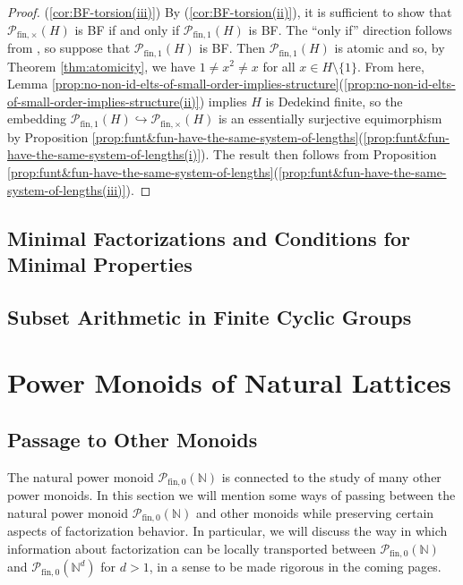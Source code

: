 \documentclass{report}
\newcommand{\NN}{\mathbb{N}}
\renewcommand{\P}{\mathcal{P}}
\newcommand{\fin}{\textrm{fin}}
\newcommand{\funt}{{\textrm{fin}, \times}}
\newcommand{\fun}{{\textrm{fin}, 1}}
\newcommand{\fon}{{\textrm{fin}, 0}}
\renewcommand{\:}{\text{:}}
\newcommand{\PN}{{\P_{\fin,0}(\NN)}}
\theoremstyle{definition}
\begin{document}
\begin{proof}
(\ref{cor:BF-torsion(iii)}) 
By (\ref{cor:BF-torsion(ii)}), it is sufficient to show that $\P_\funt(H)$ is BF if and only if $\P_\fun(H)$ is BF.
The ``only if'' direction follows from \cite[Theorem 2.28(iv) and Corollary 2.29]{fan-tringali18}, so suppose that $\P_\fun(H)$ is BF.
Then $\P_\fun(H)$ is atomic and so, by Theorem \ref{thm:atomicity}, we have $1\neq x^2 \neq x$ for all $x\in H\setminus\{1\}$.
From here, Lemma \ref{prop:no-non-id-elts-of-small-order-implies-structure}(\ref{prop:no-non-id-elts-of-small-order-implies-structure(ii)}) implies $H$ is Dedekind finite, so the embedding $\P_\fun(H)\hookrightarrow\P_\funt(H)$ is an essentially surjective equimorphism by Proposition \ref{prop:funt&fun-have-the-same-system-of-lengths}(\ref{prop:funt&fun-have-the-same-system-of-lengths(i)}).
The result then follows from Proposition \ref{prop:funt&fun-have-the-same-system-of-lengths}(\ref{prop:funt&fun-have-the-same-system-of-lengths(iii)}).
\end{proof}




\section{Minimal Factorizations and Conditions for Minimal Properties} \label{sec:min fac}


\section{Subset Arithmetic in Finite Cyclic Groups} \label{sec:finite cyclic}

\chapter{Power Monoids of Natural Lattices} \label{ch:applications}
\section{Passage to Other Monoids}\label{sec:passage}

The natural power monoid $\PN$ is connected to the study of many other power monoids.
In this section we will mention some ways of passing between the natural power monoid $\PN$ and other monoids while preserving certain aspects of factorization behavior.  
In particular, we will discuss the way in which information about factorization can be locally transported between $\PN$ and $\P_\fon(\NN^d)$ for $d>1$, in a sense to be made rigorous in the coming pages.  
\end{document}

